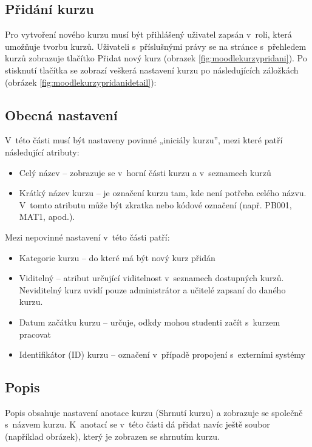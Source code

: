 \documentclass[
print,
  11pt,
  table,   
  nolof,    
  nolot,
  oneside,final
]{fithesis3}
\begin{document}
\subsection*{Přidání kurzu}
Pro vytvoření nového kurzu musí být přihlášený uživatel zapsán v~roli, kte\-rá umožňuje tvorbu kurzů. Uživateli s~příslušnými právy se na stránce s~přehledem kurzů zobrazuje tlačítko Přidat nový kurz (obrazek \ref{fig:moodlekurzypridani}). Po stisknutí tlačítka se zobrazí veškerá nastavení kurzu po následujících záložkách (obrázek \ref{fig:moodlekurzypridanidetail}):
 

\subsection*{Obecná nastavení}
V~této části musí být nastaveny povinné „iniciály kurzu”, mezi které patří následující atributy:
\begin{itemize}
	\item Celý název -- zobrazuje se v~horní části kurzu a v~seznamech kurzů
	\item Krátký název kurzu -- je označení kurzu tam, kde není potřeba celého názvu. V~tomto atributu může být zkratka nebo kódové označení (např. PB001, MAT1, apod.).
\end{itemize}
Mezi nepovinné nastavení v~této části patří:
\begin{itemize}
	\item Kategorie kurzu -- do které má být nový kurz přidán
	\item Viditelný -- atribut určující viditelnost v~seznamech dostupných kur\-zů. Neviditelný kurz uvidí pouze administrátor a učitelé zapsaní do daného kurzu.
	\item Datum začátku kurzu -- určuje, odkdy mohou studenti začít s~kurzem pracovat
	\item Identifikátor (ID) kurzu -- označení v~případě propojení s~externími systémy
\end{itemize}
\subsection*{Popis}
Popis obsahuje nastavení anotace kurzu (Shrnutí kurzu) a zobrazuje se společně s~názvem kurzu. K~anotací se v~této části dá přidat navíc ještě soubor (například obrázek), který je zobrazen se shrnutím kurzu.
\end{document}
